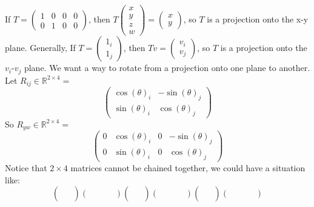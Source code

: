 \documentclass{article}
\begin{document}
If $T = \begin{pmatrix}
    1 & 0 & 0 & 0 \\
    0 & 1 & 0 & 0
\end{pmatrix}$, then $T\begin{pmatrix}
    x \\ y \\ z \\ w
    \end{pmatrix} = \begin{pmatrix}
    x \\ y
    \end{pmatrix}$,
so $T$ is a projection onto the x-y plane.
\newline\newline Generally, If $T = \begin{pmatrix}
    1_i \\
    1_j
\end{pmatrix}$, then $Tv = \begin{pmatrix}
    v_i \\ v_j
    \end{pmatrix}$,
so $T$ is a projection onto the $v_i$-$v_j$ plane.
\newline\newline We want a way to rotate from a projection onto one plane to another.
\newline\newline Let $R_{ij} \in\mathbb{R}^{2\times4}=$
\[\begin{pmatrix}
    \cos(\theta)_i & -\sin(\theta)_j \\
    \sin(\theta)_i & \cos(\theta)_j
\end{pmatrix}\]
So $R_{yw} \in\mathbb{R}^{2\times4}=$
\[\begin{pmatrix}
    0 & \cos(\theta)_i & 0 & -\sin(\theta)_j \\
    0 & \sin(\theta)_i & 0 & \cos(\theta)_j
\end{pmatrix}\]
Notice that $2\times4$ matrices cannot be chained together, we could have a situation like:
\[\begin{pmatrix}
    &\\&\\&\\
\end{pmatrix}\begin{pmatrix}
    & & &
\end{pmatrix}
\begin{pmatrix}
    &\\&\\&\\
\end{pmatrix}\begin{pmatrix}
    & & &
\end{pmatrix}
\begin{pmatrix}
    &\\&\\&\\
\end{pmatrix}\begin{pmatrix}
    & & &
\end{pmatrix}\]
\end{document}
